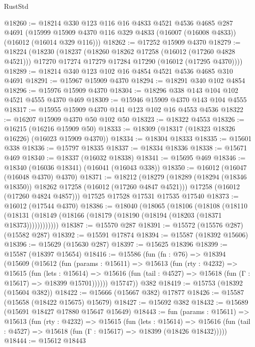 \begin{lexlean}{RustStd}
\begin{coremodule}
@18260 := @18214
    @330
    @123
    @116
    @16
    @4833
    @4521
    @4536
    @4685
    @287
    @4691
    (@15999 @15909 @4370 @116 @329 @4833 (@16007 (@16008 @4833)) (@16012 (@16014 @329 @116)))
@18262 := @17252 @15909 @4370
@18279 := @18224
    (@18230
      (@18237
        (@18260 @18262 @17258 (@16012 (@17260 @4828 @4521)))
        @17270
        @17274
        @17279
        @17284
        @17290
        (@16012 (@17295 @4370))))
@18289 := @18214 @340 @123 @102 @16 @4854 @4521 @4536 @4685 @310 @4691
@18291 := @15967 @15909 @4370
@18294 := @18291 @340 @102 @4854
@18296 := @15976 @15909 @4370
@18304 := @18296 @338 @143 @104 @102 @4521 @4555 @4370 @469
@18309 := @15946 @15909 @4370 @143 @104 @4555
@18317 := @15955 @15909 @4370 @141 @123 @102 @16 @4553 @4536
@18322 := @16207 @15909 @4370 @50 @102 @50
@18323 := @18322 @4553
@18326 := @16215 (@16216 @15909 @50)
@18333 := @18309 (@18317 (@18323 @18326 @16226) (@16023 @15909 @4370))
@18334 := @18304 @18333
@18335 := @15601 @338
@18336 := @15797 @18335
@18337 := @18334 @18336
@18338 := @15671 @469
@18340 := @18337 (@16032 @18338)
@18341 := @15695 @469
@18346 := @18340 (@16036 @18341) (@16041 (@16043 @338))
@18350 := @16012 (@16047 (@16048 @4370) @4370)
@18371 := @18212
    (@18279
      (@18289 (@18294 (@18346 @18350)) @18262 @17258 (@16012 (@17260 @4847 @4521)))
      @17258
      (@16012 (@17260 @4824 @4857)))
    @17525
    @17528
    @17531
    @17535
    @17540
@18373 := @16012 (@17544 @4370)
@18386 := @18040
    (@18065
      (@18106
        (@18108
          (@18110 (@18131 (@18149 (@18166 (@18179 (@18190 (@18194 (@18203 (@18371 @18373))))))))))))
@18387 := @15570 @287
@18391 := @15572 (@15576 @287) (@15582 @287)
@18392 := @15591 @17874
@18394 := @15587 (@18392 @15606)
@18396 := @15629 (@15630 @287)
@18397 := @15625 @18396
@18399 := @15587 (@18397 @15654)
@18416 := @15586
    (fun (fn : @76) =>
    @18394
      (@15609
        (@15612
          (fun (params : @15611) =>
          @15613
            (fun (rty : @4232) =>
            @15615
              (fun (lets : @15614) =>
              @15616 (fun (tail : @4527) => @15618 (fun (Γ : @15617) => @18399 @15701))))))
        @15747))
    @382
@18419 := @15753 (@18392 (@15604 @382))
@18422 := @15666 (@15667 @382) @17877
@18426 := @15587 (@15658 (@18422 @15675) @15679)
@18427 := @15692 @382
@18432 := @15689 (@15691 @18427 @17880 @15647 @15649)
@18443 := fun (params : @15611) =>
  @15613
    (fun (rty : @4232) =>
    @15615
      (fun (lets : @15614) =>
      @15616 (fun (tail : @4527) => @15618 (fun (Γ : @15617) => @18399 (@18426 @18432)))))
@18444 := @15612 @18443

\end{coremodule}
\end{lexlean}
